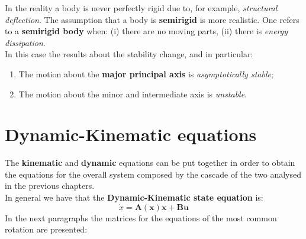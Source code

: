 In the reality a body is never perfectly rigid due to, for example, \textit{structural deflection}. The assumption that a body is \textbf{semirigid} is more realistic. One refers to a \textbf{semirigid body} when: (i) there are no moving parts, (ii) there is \textit{energy dissipation}.\\
In this case the results about the stability change, and in particular:
\begin{enumerate}
    \item The motion about the \textbf{major principal axis} is \textit{asymptotically stable};
    \item The motion about the minor and intermediate axis is \textit{unstable}.
\end{enumerate} 


\section{Dynamic-Kinematic equations}
The \textbf{kinematic} and \textbf{dynamic} equations can be put together in order to obtain the equations for the overall system composed by the cascade of the two analysed in the previous chapters.\\

\noindent
In general we have that the \textbf{Dynamic-Kinematic state equation} is:
{\Large{
    \begin{equation}
        \dot{x} = \mathbf{A(x)x+Bu}
    \end{equation}
}}
In the next paragraphs the matrices for the equations of the most common rotation are presented:
